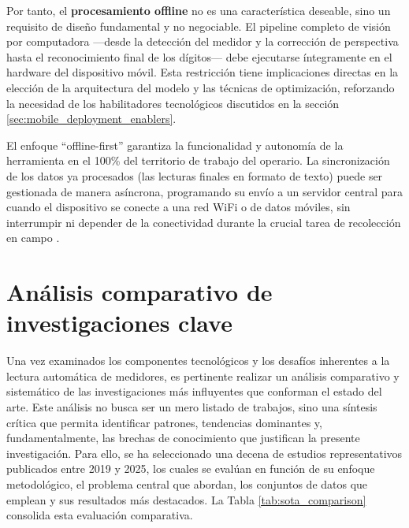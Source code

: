 Por tanto, el \textbf{procesamiento offline} no es una característica deseable, sino un requisito de diseño fundamental y no negociable. El pipeline completo de visión por computadora —desde la detección del medidor y la corrección de perspectiva hasta el reconocimiento final de los dígitos— debe ejecutarse íntegramente en el hardware del dispositivo móvil. Esta restricción tiene implicaciones directas en la elección de la arquitectura del modelo y las técnicas de optimización, reforzando la necesidad de los habilitadores tecnológicos discutidos en la sección \ref{sec:mobile_deployment_enablers}.

El enfoque ``offline-first'' garantiza la funcionalidad y autonomía de la herramienta en el 100\% del territorio de trabajo del operario. La sincronización de los datos ya procesados (las lecturas finales en formato de texto) puede ser gestionada de manera asíncrona, programando su envío a un servidor central para cuando el dispositivo se conecte a una red WiFi o de datos móviles, sin interrumpir ni depender de la conectividad durante la crucial tarea de recolección en campo \parencite{Santiago2020Deployment, Carvalho2023}.

\section{Análisis comparativo de investigaciones clave}
\label{sec:comparative_analysis}

Una vez examinados los componentes tecnológicos y los desafíos inherentes a la lectura automática de medidores, es pertinente realizar un análisis comparativo y sistemático de las investigaciones más influyentes que conforman el estado del arte. Este análisis no busca ser un mero listado de trabajos, sino una síntesis crítica que permita identificar patrones, tendencias dominantes y, fundamentalmente, las brechas de conocimiento que justifican la presente investigación. Para ello, se ha seleccionado una decena de estudios representativos publicados entre 2019 y 2025, los cuales se evalúan en función de su enfoque metodológico, el problema central que abordan, los conjuntos de datos que emplean y sus resultados más destacados. La Tabla \ref{tab:sota_comparison} consolida esta evaluación comparativa.

